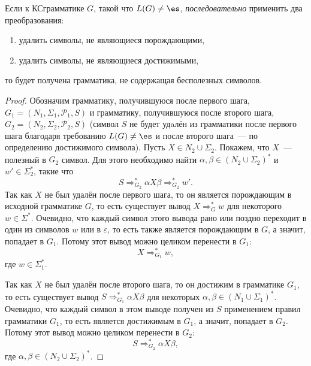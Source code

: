 \begin{Thm} 
Если к КС\nbdash{}грамматике $G$, такой что $L(G) \neq \es$,
\emph{последовательно} применить два преобразования:
\begin{enumerate}
  \item удалить символы, не являющиеся порождающими,
  \item удалить символы, не являющиеся достижимыми,
\end{enumerate}
то будет получена грамматика, не содержащая бесполезных символов.
\end{Thm}
\begin{proof}
Обозначим грамматику, получившуюся после первого шага, $G_1 = (N_1, \Sigma_1,
\mathcal P_1, S)$ и грамматику, получившуюся после второго шага, $G_2 = (N_2,
\Sigma_2, \mathcal P_2, S)$ (символ $S$ не будет удaлён из грамматики после
первого шага благодаря требованию $L(G) \neq \es$ и после второго шага~— по
определению достижимого символа). Пусть $X \in N_2 \cup \Sigma_2$. Покажем, что
$X$~— полезный в $G_2$ символ. Для этого необходимо найти $\alpha, \beta \in
(N_2 \cup \Sigma_2)^*$ и $w' \in \Sigma_2^*$, такие что
\begin{equation}\label{isxusefull}
    S \Rightarrow^{*}_{G_2} \alpha X \beta \Rightarrow^{*}_{G_2} w'.
\end{equation}
Так как $X$ не был удалён после первого шага, то он является порождающим в
исходной грамматике $G$, то есть существует вывод $X \Rightarrow^*_G w$ для
некоторого $w \in \Sigma^*$. Очевидно, что каждый символ этого вывода рано или
поздно переходит в один из символов $w$ или в $\varepsilon$, то есть также
является порождающим в $G$, а значит, попадает в $G_1$. Потому этот вывод можно
целиком перенести в $G_1$:
\begin{equation}\label{xgen}
    X \Rightarrow^*_{G_1} w,
\end{equation}
где $w \in  \Sigma_1^*$.

Так как $X$ не был удалён после второго шага, то он достижим в грамматике
$G_1$, то есть существует вывод $S \Rightarrow^{*}_{G_1} \alpha X \beta$
для некоторых $\alpha, \beta \in (N_1 \cup \Sigma_1)^*$. Очевидно, что каждый
символ в этом выводе получен из $S$ применением правил грамматики $G_1$, то
есть является достижимым в $G_1$, а значит, попадает в $G_2$. Потому этот вывод
можно целиком перенести в $G_2$:
\begin{equation}\label{xreach}
    S \Rightarrow^{*}_{G_2} \alpha X \beta,
\end{equation}
где $\alpha, \beta \in (N_2 \cup \Sigma_2)^*$.


\end{proof}
